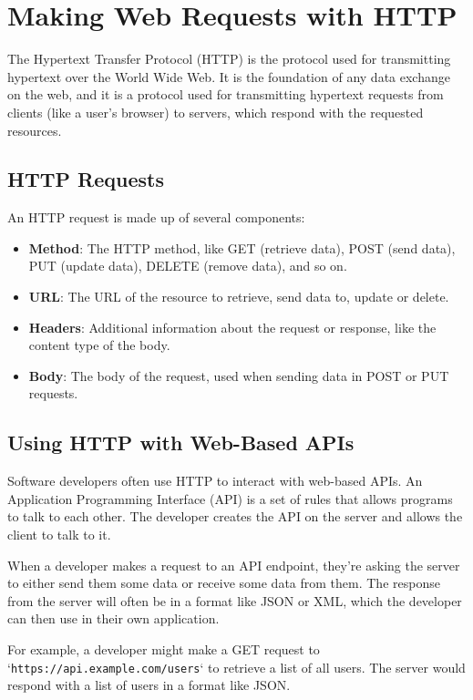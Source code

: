 \chapter{Making Web Requests with HTTP}

The Hypertext Transfer Protocol (HTTP) is the protocol used for
transmitting hypertext over the World Wide Web. It is the foundation
of any data exchange on the web, and it is a protocol used for
transmitting hypertext requests from clients (like a user's browser)
to servers, which respond with the requested resources.

\section{HTTP Requests}

An HTTP request is made up of several components:

\begin{itemize}
    \item \textbf{Method}: The HTTP method, like GET (retrieve data), POST (send data), PUT (update data), DELETE (remove data), and so on.
    \item \textbf{URL}: The URL of the resource to retrieve, send data to, update or delete.
    \item \textbf{Headers}: Additional information about the request or response, like the content type of the body.
    \item \textbf{Body}: The body of the request, used when sending data in POST or PUT requests.
\end{itemize}

\section{Using HTTP with Web-Based APIs}

Software developers often use HTTP to interact with web-based APIs. An
Application Programming Interface (API) is a set of rules that allows
programs to talk to each other. The developer creates the API on the
server and allows the client to talk to it.

When a developer makes a request to an API endpoint, they're asking
the server to either send them some data or receive some data from
them. The response from the server will often be in a format like JSON
or XML, which the developer can then use in their own application.

For example, a developer might make a GET request to
`\texttt{https://api.example.com/users}` to retrieve a list of all
users. The server would respond with a list of users in a format like
JSON.

